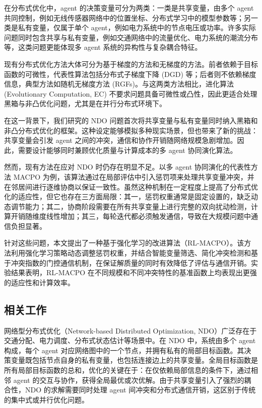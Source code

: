 \documentclass[12pt]{ctexart}
\begin{document}
在分布式优化中，agent 的决策变量可分为两类：一类是共享变量，由多个 agent
共同控制，例如无线传感器网络中的位置坐标、分布式学习中的模型参数等；另一类是私有变量，仅属于单个
agent，例如电力系统中的节点电压或功率。许多实际问题同时包含共享与私有变量，例如交通网络中的流量优化、电力系统的潮流分布等，这类问题更能体现多
agent 系统的异构性与复杂耦合特征。

现有分布式优化方法大体可分为基于梯度的方法和无梯度的方法。前者依赖于目标函数的可微性，代表性算法包括分布式子梯度下降
(DGD) 等；后者则不依赖梯度信息，典型方法如随机无梯度方法
(RGFs)。与这两类方法相比，进化算法 (Evolutionary Computation, EC)
不要求问题具备可微性或凸性，因此更适合处理黑箱与非凸优化问题，尤其是在并行分布式环境下。

在这一背景下，我们研究的 NDO
问题首次将共享变量与私有变量同时纳入黑箱和非凸分布式优化的框架。这种设定能够模拟多种现实场景，但也带来了新的挑战：共享变量会引发
agent
之间的冲突，通信和协作开销随网络规模急剧增加。因此，需要设计能够同时兼顾优化质量与计算成本的多
agent 协同演化算法。

然而，现有方法在应对 NDO 时仍存在明显不足。以多 agent
协同演化的代表性方法 MACPO
为例，该算法通过在局部评估中引入惩罚项来处理共享变量冲突，并在邻居间进行逐维协商以保证一致性。虽然这种机制在一定程度上提高了分布式优化的适应性，但它也存在三方面局限：其一，惩罚权重通常是固定设置的，缺乏动态调节能力；其二，协商阶段需要在所有共享变量上进行完整的双向扰动检测，计算开销随维度线性增加；其三，每轮迭代都必须触发通信，导致在大规模问题中通信负担显著。

针对这些问题，本文提出了一种基于强化学习的改进算法（RL-MACPO）。该方法利用强化学习策略动态调整惩罚权重，并结合智能变量筛选、简化冲突检测和基于冲突指数的门控通信机制，在保证解质量的同时有效降低了评估与通信开销。实验结果表明，RL-MACPO
在不同规模和不同冲突特性的基准函数上均表现出更强的适应性和计算效率。

\subsection{相关工作}\label{ux76f8ux5173ux5de5ux4f5c}

网络型分布式优化（Network-based Distributed Optimization,
NDO）广泛存在于交通分配、电力调度、分布式状态估计等场景中。在 NDO
中，系统由多个 agent 构成，每个 agent
对应网络图中的一个节点，并拥有私有的局部目标函数。其决策变量既包括节点自身的私有变量，也包括连接边上的共享变量。全局目标函数是所有局部目标函数的总和，优化的关键在于：在仅依赖局部信息的条件下，通过相邻
agent
的交互与协作，获得全局最优或次优解。由于共享变量引入了强烈的耦合性，NDO
的求解需要同时处理 agent
间冲突和分布式通信开销，这区别于传统的集中式或并行优化问题。
\end{document}
